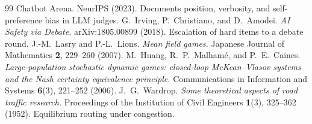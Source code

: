 \documentclass[11pt]{article}
\begin{document}
\begin{thebibliography}{99}
{Chatbot Arena.} NeurIPS (2023). Documents position, verbosity, and self-preference bias in LLM judges.
 G.~Irving, P.~Christiano, and D.~Amodei. \emph{AI Safety via Debate.} arXiv:1805.00899
(2018). Escalation of hard items to a debate round.
 J.-M.~Lasry and P.-L.~Lions. \emph{Mean field games.} Japanese Journal of Mathematics
\textbf{2}, 229--260 (2007).
 M.~Huang, R.~P.~Malhamé, and P.~E.~Caines. \emph{Large-population stochastic dynamic games:
closed-loop McKean--Vlasov systems and the Nash certainty equivalence principle.} Communications in
Information and Systems \textbf{6}(3), 221--252 (2006).
 J.~G.~Wardrop. \emph{Some theoretical aspects of road traffic research.} Proceedings of the
Institution of Civil Engineers \textbf{1}(3), 325--362 (1952). Equilibrium routing under congestion.
\end{thebibliography}
\end{document}
